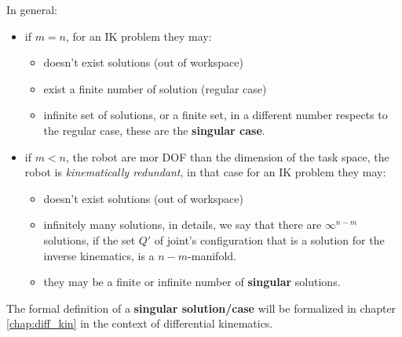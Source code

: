\documentclass[10pt, letterpaper]{report}
\begin{document}
In general:\begin{itemize}
    \item if $m=n$, for an IK problem they may:\begin{itemize}
        \item doesn't exist solutions (out of workspace)
        \item exist a finite number of solution (regular case)
        \item infinite set of solutions, or a finite set, in a different number respects to the regular case, these are the \textbf{singular case}. 
    \end{itemize}
    \item if $m<n$, the robot are mor DOF than the dimension of the task space, the robot is \textit{kinematically redundant}, in that case for an IK problem they may:\begin{itemize}
    \item  doesn't exist solutions (out of workspace)
    \item infinitely many solutions, in details, we say that there are $\infty^{n-m}$ solutions, if the set $Q'$ of joint's configuration that is a solution for the inverse kinematics, is a $n-m$-manifold.
    \item they may be a finite or infinite number of \textbf{singular} solutions.
    \end{itemize}
\end{itemize}
The formal definition of a \textbf{singular solution/case} will be formalized in chapter \ref{chap:diff_kin} in the context of differential kinematics.
\end{document}
